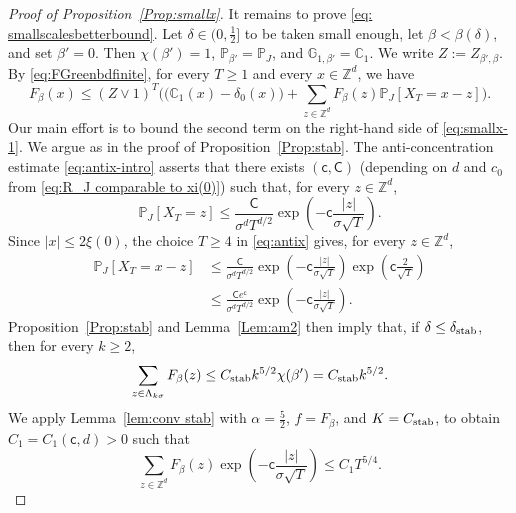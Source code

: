 \documentclass[11pt,a4paper]{article}
\numberwithin{equation}{section}
\theoremstyle{plain}
\theoremstyle{definition}
\newcommand\1{\mathds{1}}
\newcommand\CGreen{\mathsf{C}}
\newcommand\cGreen{\mathsf{c}}
\begin{document}
\begin{proof}[Proof of Proposition~\textup{\ref{Prop:smallx}}]
    It remains to prove \eqref{eq: smallscalesbetterbound}. Let $\delta\in(0,\tfrac12]$ to be taken small enough, let $\beta<\beta(\delta)$, and set $\beta' = 0$.
    Then $\chi(\beta') = 1$, $\mathbb P_{\beta' } = \mathbb P_J $, and $\mathbb G_{1,\beta'} = \mathbb{C}_{1}$.
    We write $Z:=Z_{\beta',\beta}$. By \eqref{eq:FGreenbdfinite}, for every $T\geq 1$ and every $x\in \mathbb Z^d$, we have
    \begin{equation}
    \label{eq:smallx-1}
	F_\beta(x)
    \leq
    (Z\vee 1)^T\Big(
    \big(\mathbb{C}_1(x) -\delta_{0}(x)\big)
    +\sum_{z\in \mathbb Z^d}F_\beta(z)\mathbb P_{J}[X_T=x-z]
    \Big).
    \end{equation}
    Our main effort is to bound the second term on the right-hand side of \eqref{eq:smallx-1}. We argue as in the proof of Proposition~\ref{Prop:stab}.
    The anti-concentration estimate \eqref{eq:antix-intro} asserts that there exists $(\cGreen,\CGreen)$ (depending on $d$ and $c_0$ from \eqref{eq:R_J comparable to xi(0)})
    such that, for every $z\in \mathbb Z^d$,
    \begin{equation}
    \label{eq:antix}
	\mathbb P_{J}[X_T = z ]\leq \frac{\CGreen}{\sigma^d T^{d/2}}\exp\left(-\cGreen\frac{|z|}{\sigma\sqrt{T}}\right).
    \end{equation}
Since $|x|\le 2\xi(0)$, the choice $T\ge 4$ in \eqref{eq:antix} gives, for every $z\in \mathbb Z^d$,
\begin{align}
    \mathbb P_{J}[X_T = x-z ]&\leq \frac{\CGreen}{\sigma^d T^{d/2}}\exp\left(-\cGreen\frac{|z|}{\sigma\sqrt{T}}\right) \exp\left(\cGreen\frac{2}{\sqrt{T}}\right)
    \nonumber \\
    &\leq \frac{\CGreen e^{\cGreen}}{\sigma^d T^{d/2}}
    \exp\left(-\cGreen\frac{|z|}{\sigma\sqrt{T}}\right).
\label{eq: smalleq1}
\end{align}
Proposition~\ref{Prop:stab} and Lemma~\ref{Lem:am2} then
imply that, if $\delta \leq \delta_{\textup{stab}}$, then for every $k\geq 2$,
\begin{equation}
    \sum_{z \in \Lambda_{k\sigma}}F_{\beta}(z) \leq C_{\textup{stab}} k^{5/2} \chi(\beta') = C_{\textup{stab}} k^{5/2}.
\end{equation}
We apply Lemma~\ref{lem:conv stab}
with $\alpha = \frac 52$, $f=F_\beta$, and $K = C_{\textup{stab}} $, to obtain $C_1 = C_1(\cGreen,d)>0$ such that
\begin{equation}
    \sum_{z \in \mathbb{Z}^d}F_{\beta}(z)
    \exp\left(-\cGreen\frac{|z|}{\sigma\sqrt{T}}\right)
     \leq C_1  T^{5/4}\label{eq: smalleq2}.

\end{equation}
\end{proof}
\end{document}
